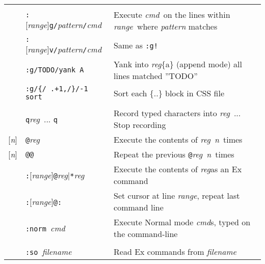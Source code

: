 \documentclass[main.tex]{subfiles}
\newcommand{\vmode}[1]{\colorbox{clrlightgray}{#1 mode}}
\newcommand{\vcmd}{\textit{cmd}}
\newcommand{\vfname}{\textit{filename}}
\newcommand{\vnum}{\textit{n}}
\newcommand{\vrange}{\textit{range}}
\newcommand{\vregister}{\textit{reg}}
\begin{document}
\begin{longtable}{ r l | l}
  \multicolumn{3}{l}{} \lstinline|:help multi-repeat|  \\
  & \lstinline$:$[\vrange]\lstinline$g/$\emph{pattern}\lstinline$/$\vcmd & Execute \vcmd\ on the lines within \vrange\ where \emph{pattern} matches  \\
  & \lstinline$:$[\vrange]\lstinline$v/$\emph{pattern}\lstinline$/$\vcmd & Same as \lstinline|:g!| \\
  & \lstinline$:g/TODO/yank A$ & Yank into \vregister\{a\} (append mode) all lines matched ''TODO'' \\
  & \lstinline$:g/{/ .+1,/}/-1 sort$ & Sort each \{..\} block in CSS file \\

  \multicolumn{3}{l}{} \lstinline|:help complex-repeat|  \\
  & \lstinline$q$\vregister\ ... \lstinline$q$ & Record typed characters into \vregister\ ... Stop recording \\
  {[}\vnum] & \lstinline$@$\vregister & \multicolumn{1}{l}{Execute the contents of \vregister\ \vnum\ times} \lstinline|:h registers|  \\
  {[}\vnum] & \lstinline$@@$ & Repeat the previous \lstinline$@$\vregister\ \vnum\ times \\
  & \lstinline$:$[\vrange]\lstinline$@$\vregister|\lstinline$*$\vregister & Execute the contents of \vregister as an Ex command \\
  & \lstinline$:$[\vrange]\lstinline$@:$ & Set cursor at line \vrange, repeat last command line\\
  & \lstinline$:norm $\vcmd & Execute \vmode{Normal} \vcmd s, typed on the command-line \\

  \multicolumn{3}{l}{} \lstinline|:help using-scripts|  \\
  & \lstinline$:so $\vfname & Read Ex commands from \vfname \\
  \hline


\end{longtable}
\end{document}
